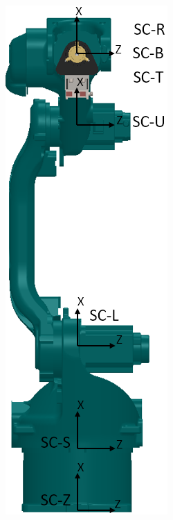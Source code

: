 \begin{figure}[h]
    \centering
    \begin{subfigure}[b]{0.20\textwidth}
        \includegraphics[width=\textwidth]{figs/sc_front}

\end{subfigure}
\end{figure}
